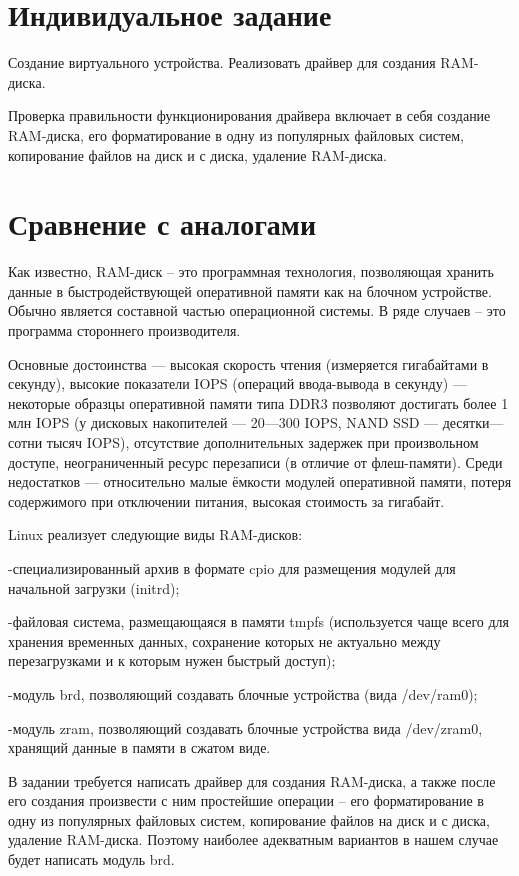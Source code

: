 \documentclass[11pt]{article}
\begin{document}
\section{Индивидуальное задание}

Создание виртуального устройства. Реализовать драйвер для создания RAM-диска.

Проверка правильности функционирования драйвера включает в себя создание RAM-диска, его форматирование в одну из популярных файловых систем, копирование файлов на диск и с диска, удаление RAM-диска.

\section{Сравнение с аналогами}

Как известно, RAM-диск – это программная технология, позволяющая хранить данные в быстродействующей оперативной памяти как на блочном устройстве. Обычно является составной частью операционной системы. В ряде случаев – это программа стороннего производителя.

Основные достоинства — высокая скорость чтения (измеряется гигабайтами в секунду), высокие показатели IOPS (операций ввода-вывода в секунду) — некоторые образцы оперативной памяти типа DDR3 позволяют достигать более 1 млн IOPS (у дисковых накопителей — 20—300 IOPS, NAND SSD — десятки—сотни тысяч IOPS), отсутствие дополнительных задержек при произвольном доступе, неограниченный ресурс перезаписи (в отличие от флеш-памяти). Среди недостатков — относительно малые ёмкости модулей оперативной памяти, потеря содержимого при отключении питания, высокая стоимость за гигабайт.

Linux реализует следующие виды RAM-дисков:

-специализированный архив в формате cpio для размещения модулей для начальной загрузки (initrd);

-файловая система, размещающаяся в памяти tmpfs (используется чаще всего для хранения временных данных, сохранение которых не актуально между перезагрузками и к которым нужен быстрый доступ);

-модуль brd, позволяющий создавать блочные устройства (вида /dev/ram0);

-модуль zram, позволяющий создавать блочные устройства вида /dev/zram0, хранящий данные в памяти в сжатом виде.

В задании требуется написать драйвер для создания RAM-диска, а также после его создания произвести с ним простейшие операции – его форматирование в одну из популярных файловых систем, копирование файлов на диск и с диска, удаление RAM-диска. Поэтому наиболее адекватным вариантов в нашем случае будет написать модуль brd.
\end{document}
